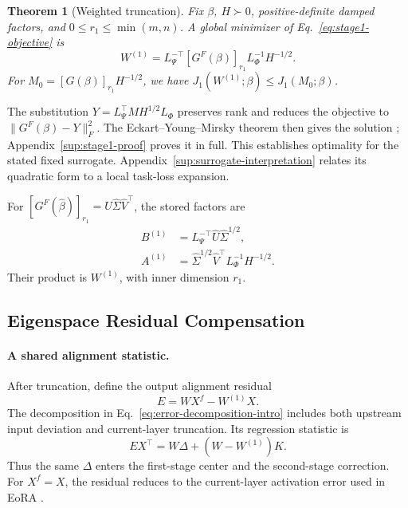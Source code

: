 \documentclass[11pt]{article}
\newtheorem{theorem}{Theorem}
\begin{document}
\begin{theorem}[Weighted truncation]\label{thm:fisher}
Fix $\beta$, $H\succ0$, positive-definite damped factors, and $0\le r_1\le\min(m,n)$. A global minimizer of Eq.~\eqref{eq:stage1-objective} is
\begin{equation}
W^{(1)}=L_\Psi^{-\top}[G^F(\beta)]_{r_1}
L_\Phi^{-1}H^{-1/2}.
\label{eq:stage1-output}
\end{equation}
For $M_0=[G(\beta)]_{r_1}H^{-1/2}$, we have $J_1(W^{(1)};\beta)\le J_1(M_0;\beta)$.
\end{theorem}

The substitution $Y=L_\Psi^\top MH^{1/2}L_\Phi$ preserves rank and reduces the objective to $\|G^F(\beta)-Y\|_F^2$. The Eckart--Young--Mirsky theorem then gives the solution \citep{eckart1936eym}; Appendix~\ref{sup:stage1-proof} proves it in full. This establishes optimality for the stated fixed surrogate. Appendix~\ref{sup:surrogate-interpretation} relates its quadratic form to a local task-loss expansion.

For $[G^F(\widehat\beta)]_{r_1}=\hat U\hat\Sigma\hat V^\top$, the stored factors are
\begin{equation}
\begin{aligned}
B^{(1)}&=L_\Psi^{-\top}\hat U\hat\Sigma^{1/2},\\
A^{(1)}&=\hat\Sigma^{1/2}\hat V^\top L_\Phi^{-1}H^{-1/2}.
\end{aligned}
\label{eq:stage1-factors}
\end{equation}
Their product is $W^{(1)}$, with inner dimension $r_1$.

\subsection{Eigenspace Residual Compensation}\label{sec:eigenspace-comp}

\paragraph{A shared alignment statistic.}
After truncation, define the output alignment residual
\begin{equation}
E=WX^f-W^{(1)}X.
\label{eq:global-alignment-error}
\end{equation}
The decomposition in Eq.~\eqref{eq:error-decomposition-intro} includes both upstream input deviation and current-layer truncation. Its regression statistic is
\begin{equation}
EX^\top=W\Delta+(W-W^{(1)})K.
\label{eq:residual-statistic}
\end{equation}
Thus the same $\Delta$ enters the first-stage center and the second-stage correction. For $X^f=X$, the residual reduces to the current-layer activation error used in EoRA \citep{liu2025eora}.
\end{document}
